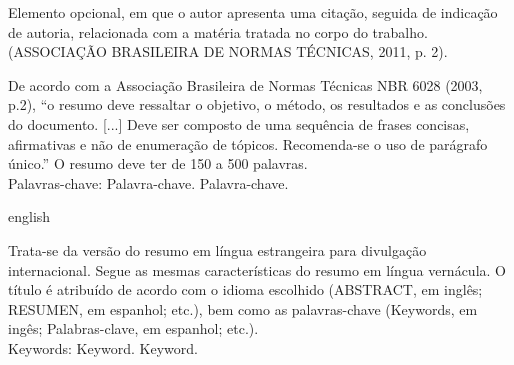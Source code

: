 \documentclass[
        oneside,      %
        english,			
        brazil			 
        ]{abntbibufjf}
\begin{document}

\begin{epigrafemais} %
	Elemento opcional, em que o autor apresenta uma cita\c{c}\~ao, seguida de indica\c{c}\~ao de autoria, relacionada com a                       
  mat\'eria tratada no corpo do trabalho. (ASSOCIA\c{C}\~AO BRASILEIRA DE NORMAS T\'ECNICAS, 2011, p. 2).
\end{epigrafemais}



\begin{resumo}

De acordo com a Associa\c{c}\~ao Brasileira de Normas T\'ecnicas NBR 6028 (2003, p.2), ``o resumo deve ressaltar 
o objetivo, o m\'etodo, os resultados e as conclus\~oes do documento. [...] Deve ser composto de uma sequ\^encia de frases 
concisas, afirmativas e n\~ao de enumera\c{c}\~ao de t\'opicos. Recomenda-se o uso de par\'agrafo \'unico.'' 
O resumo deve ter de 150 a 500 palavras. \\[18pt]
Palavras-chave: Palavra-chave. Palavra-chave. %
\end{resumo}
 
 
\begin{resumo}[ABSTRACT]
 \begin{otherlanguage*}{english}

Trata-se da vers\~ao do resumo em l\'ingua estrangeira para divulga\c{c}\~ao internacional. Segue as mesmas caracter\'isticas do resumo em 
l\'ingua vern\'acula. O t\'itulo \'e atribu\'ido de acordo com o idioma escolhido (ABSTRACT, em ingl\^es; RESUMEN, em espanhol; etc.), bem como 
as palavras-chave (Keywords, em ing\^es; Palabras-clave, em espanhol; etc.). \\[18pt]
Keywords: Keyword. Keyword. %
 \end{otherlanguage*}
\end{resumo}




\end{document}
